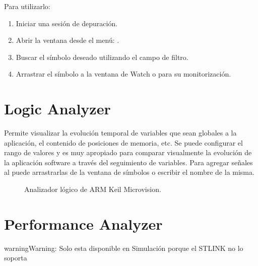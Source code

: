 \documentclass[letterpaper,10pt,english]{sphinxmanual}
\begin{document}
\sphinxAtStartPar
Para utilizarlo:
\begin{enumerate}
%
\item {} 
\sphinxAtStartPar
Iniciar una sesión de depuración.

\item {} 
\sphinxAtStartPar
Abrir la ventana desde el menú: .

\item {} 
\sphinxAtStartPar
Buscar el símbolo deseado utilizando el campo de filtro.

\item {} 
\sphinxAtStartPar
Arrastrar el símbolo a la ventana de Watch o  para su monitorización.

\end{enumerate}


\section{Logic Analyzer}
\label{\detokenize{cmsis-rtos:logic-analyzer}}
\sphinxAtStartPar
Permite visualizar la evolución temporal de variables que sean globales a la aplicación, el contenido de posiciones de memoria, etc. Se puede configurar el rango de valores y es muy apropiado para comparar visualmente la evolución de la aplicación software a través del seguimiento de variables.
Para agregar señales al  puede arrastrarlas de la ventana de símbolos o escribir el nombre de la misma.

\begin{figure}[htbp]
\centering
\capstart

\noindent{}
\caption{Analizador lógico de ARM Keil Microvision.}\label{\detokenize{cmsis-rtos:id2}}\end{figure}


\section{Performance Analyzer}
\label{\detokenize{cmsis-rtos:performance-analyzer}}
\begin{sphinxadmonition}{warning}{Warning:}
\sphinxAtStartPar
Solo esta disponible en Simulación porque el ST\sphinxhyphen{}LINK no lo soporta
\end{sphinxadmonition}
\end{document}
